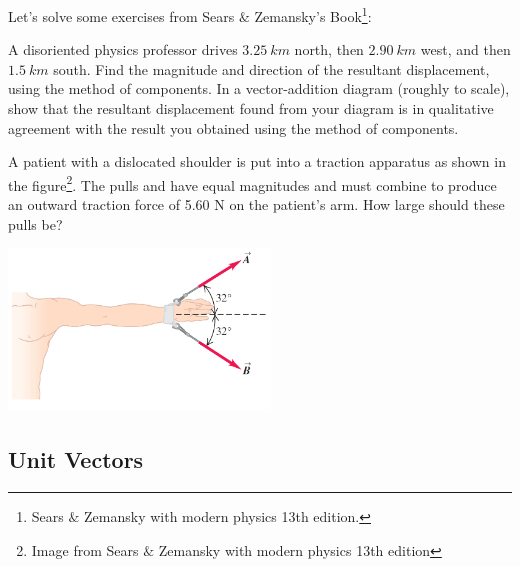 \documentclass[]{beamer}
\begin{document}

\begin{frame}


   Let's solve some exercises from Sears $\&$ Zemansky's Book\footnote{Sears $\&$  Zemansky with modern physics 13th edition.}:
   \vspace{3 mm}

   A disoriented physics professor drives $3.25~km$ north, then
   $2.90~km$ west, and then $1.5~km$ south. Find the magnitude and direction
   of the resultant displacement, using the method of components.
   In a vector-addition diagram (roughly to scale), show that the resultant
   displacement found from your diagram is in qualitative agreement
   with the result you obtained using the method of components.
   
\end{frame}



\begin{frame}



   \vspace{3 mm}

   A patient with a dislocated
   shoulder is put into a traction apparatus as shown in the figure\footnote{Image from Sears $\&$  Zemansky with modern physics 13th edition}.
   The pulls and have equal magnitudes and must combine to
   produce an outward traction force of 5.60 N on the patient’s arm.
   How large should these pulls be?

   \begin{center}
      \includegraphics[height=1.7in]{images/ex.png}
    \end{center}
   
\end{frame}


\subsection{Unit Vectors}
\end{document}
